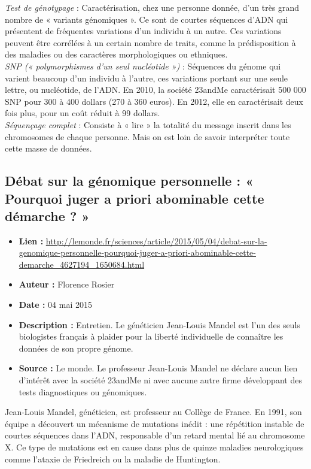 \documentclass[8pt]{article}
\begin{document}
\textit{Test de génotypage} : Caractérisation, chez une personne donnée, d’un très grand nombre de « variants génomiques ». Ce sont de courtes séquences d’ADN qui présentent de fréquentes variations d’un individu à un autre. Ces variations peuvent être corrélées à un certain nombre de traits, comme la prédisposition à des maladies ou des caractères morphologiques ou ethniques. \\

\textit{SNP (« polymorphismes d’un seul nucléotide »)} : Séquences du génome qui varient beaucoup d’un individu à l’autre, ces variations portant sur une seule lettre, ou nucléotide, de l’ADN. En 2010, la société 23andMe caractérisait 500 000 SNP pour 300 à 400 dollars (270 à 360 euros). En 2012, elle en caractérisait deux fois plus, pour un coût réduit à 99 dollars. \\

\textit{Séquençage complet} : Consiste à « lire » la totalité du message inscrit dans les chromosomes de chaque personne. Mais on est loin de savoir interpréter toute cette masse de données. \\

\subsection{Débat sur la génomique personnelle : « Pourquoi juger a priori abominable cette démarche ? »}

\begin{itemize}
	\item \textbf{Lien : }  \url{ http://lemonde.fr/sciences/article/2015/05/04/debat-sur-la-genomique-personnelle-pourquoi-juger-a-priori-abominable-cette-demarche_4627194_1650684.html} 
	\item \textbf{Auteur : } Florence Rosier
	\item \textbf{Date : } 04 mai 2015
	\item \textbf{Description : } Entretien. Le généticien Jean-Louis Mandel est l’un des seuls biologistes français à plaider pour la liberté individuelle de connaître les données de son propre génome.
	\item \textbf{Source : } Le monde. Le professeur Jean-Louis Mandel ne déclare aucun lien d’intérêt avec la société 23andMe ni avec aucune autre firme développant des tests diagnostiques ou génomiques.
\end{itemize}

Jean-Louis Mandel, généticien, est professeur au Collège de France. En 1991, son équipe a découvert un mécanisme de mutations inédit : une répétition instable de courtes séquences dans l’ADN, responsable d’un retard mental lié au chromosome X. Ce type de mutations est en cause dans plus de quinze maladies neurologiques comme l’ataxie de Friedreich ou la maladie de Huntington. \\
\end{document}
